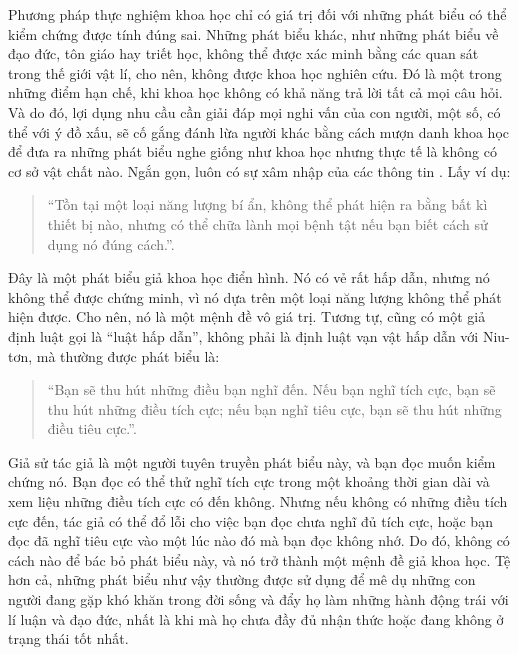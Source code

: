 Phương pháp thực nghiệm khoa học chỉ có giá trị đối với những phát biểu có thể kiểm chứng được tính đúng sai. Những phát biểu khác, như những phát biểu về đạo đức, tôn giáo hay triết học, không thể được xác minh bằng các quan sát trong thế giới vật lí, cho nên, không được khoa học nghiên cứu. Đó là một trong những điểm hạn chế, khi khoa học không có khả năng trả lời tất cả mọi câu hỏi. Và do đó, lợi dụng nhu cầu cần giải đáp mọi nghi vấn của con người, một số, có thể với ý đồ xấu, sẽ cố gắng đánh lừa người khác bằng cách mượn danh khoa học để đưa ra những phát biểu nghe giống như khoa học nhưng thực tế là không có cơ sở vật chất nào. Ngắn gọn, luôn có sự xâm nhập của các thông tin . Lấy ví dụ:
\begin{quotation}
    ``Tồn tại một loại năng lượng bí ẩn, không thể phát hiện ra bằng bất kì thiết bị nào, nhưng có thể chữa lành mọi bệnh tật nếu bạn biết cách sử dụng nó đúng cách.''.
\end{quotation}
Đây là một phát biểu giả khoa học điển hình. Nó có vẻ rất hấp dẫn, nhưng nó không thể được chứng minh, vì nó dựa trên một loại năng lượng không thể phát hiện được. Cho nên, nó là một mệnh đề vô giá trị. Tương tự, cũng có một giả định luật gọi là ``luật hấp dẫn'', không phải là định luật vạn vật hấp dẫn với Niu-tơn, mà thường được phát biểu là:
\begin{quotation}
    ``Bạn sẽ thu hút những điều bạn nghĩ đến. Nếu bạn nghĩ tích cực, bạn sẽ thu hút những điều tích cực; nếu bạn nghĩ tiêu cực, bạn sẽ thu hút những điều tiêu cực.''.
\end{quotation}
Giả sử tác giả là một người tuyên truyền phát biểu này, và bạn đọc muốn kiểm chứng nó. Bạn đọc có thể thử nghĩ tích cực trong một khoảng thời gian dài và xem liệu những điều tích cực có đến không. Nhưng nếu không có những điều tích cực đến, tác giả có thể đổ lỗi cho việc bạn đọc chưa nghĩ đủ tích cực, hoặc bạn đọc đã nghĩ tiêu cực vào một lúc nào đó mà bạn đọc không nhớ. Do đó, không có cách nào để bác bỏ phát biểu này, và nó trở thành một mệnh đề giả khoa học. Tệ hơn cả, những phát biểu như vậy thường được sử dụng để mê dụ những con người đang gặp khó khăn trong đời sống và đẩy họ làm những hành động trái với lí luận và đạo đức, nhất là khi mà họ chưa đầy đủ nhận thức hoặc đang không ở trạng thái tốt nhất.